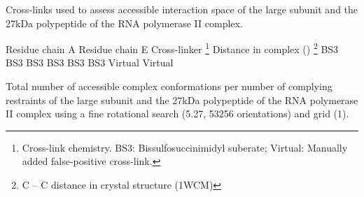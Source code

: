 \caption{}
{Cross-links used to assess accessible interaction space of the large subunit
and the 27kDa polypeptide of the RNA polymerase II complex.}
\stopbuffer

\startlocalfootnotes
\bTABLE
\bTABLEhead
\bTR
\bTD Residue chain A  \eTD \bTD  Residue chain E  \eTD 
\bTD  Cross-linker \footnote{Cross-link chemistry. BS3: Bissulfosuccinimidyl
suberate; Virtual: Manually added false-positive cross-link.}   
\eTD 
\bTD
Distance in complex (\Angstrom) \footnote{C\low{\m{\beta}} -- C\low{\m{\beta}}
distance in crystal structure (1WCM)} 
\eTD
\eTR
\eTABLEhead
\bTABLEbody
\bTR
{}     \eTD {}      \eTD \bTD BS3      \eTD {} \eTD
\eTR
\bTR
{}      \eTD {}      \eTD \bTD BS3      \eTD {} \eTD
\eTR
\bTR
{}      \eTD {}      \eTD \bTD BS3      \eTD {} \eTD
\eTR
\bTR
{}       \eTD {}      \eTD \bTD BS3      \eTD {} \eTD
\eTR
\bTR
{}      \eTD {}      \eTD \bTD BS3      \eTD {} \eTD
\eTR
\bTR
{}      \eTD {}      \eTD \bTD BS3      \eTD {} \eTD
\eTR
\bTR
{}      \eTD {}      \eTD \bTD Virtual  \eTD {} \eTD
\eTR
\bTR
{}     \eTD {}      \eTD \bTD Virtual  \eTD {} \eTD
\eTR
\eTABLEbody
\eTABLE
\placelocalfootnotes
\stoplocalfootnotes
\stopbuffer


\caption{}
{Total number of accessible complex conformations per number of complying
restraints of the large subunit and the 27kDa polypeptide of the RNA polymerase
II complex using a fine rotational search (5.27\Deg, 53256 orientations) and
grid (1\Angstrom).} 
\stopbuffer

